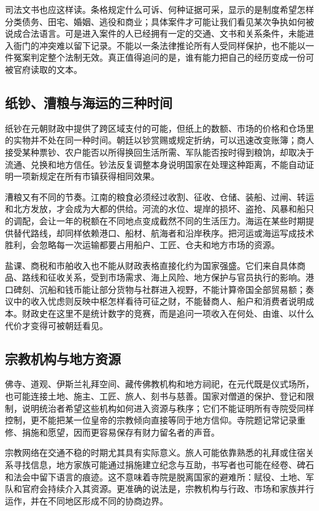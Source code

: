 司法文书也应这样读。条格规定什么可诉、何种证据可采，显示的是制度希望怎样分类债务、田宅、婚姻、逃役和商业；具体案件才可能让我们看见某次争执如何被说成合法语言。可是进入案件的人已经拥有一定的交通、文书和关系条件，未能进入衙门的冲突难以留下记录。不能以一条法律推论所有人受同样保护，也不能以一件冤案判定整个法制无效。真正值得追问的是，谁有能力把自己的经历变成一份可被官府读取的文本。

\subsection{纸钞、漕粮与海运的三种时间}

纸钞在元朝财政中提供了跨区域支付的可能，但纸上的数额、市场的价格和仓场里的实物并不处在同一种时间。朝廷以钞赏赐或规定折纳，可以迅速改变账簿；商人接受某种票钞、农户能否以所得换回生活所需、军队能否按时得到粮饷，却取决于流通、兑换和地方信任。钞法反复调整本身说明国家在处理这种距离，不能自动证明一项新规定在所有市镇获得相同效果。

漕粮又有不同的节奏。江南的粮食必须经过收割、征收、仓储、装船、过闸、转运和北方发放，才会成为大都的供给。河流的水位、堤岸的损坏、盗抢、风暴和船只的调配，会让一年的税额在不同地点变成截然不同的生活压力。海运在某些时期提供替代路线，却同样依赖港口、船材、航海者和沿岸秩序。把河运或海运写成技术胜利，会忽略每一次运输都要占用船户、工匠、仓夫和地方市场的资源。

盐课、商税和市舶收入也不能从财政表格直接化约为国家强盛。它们来自具体商品、路线和征收关系，受到市场需求、海上风险、地方保护与官员执行的影响。港口碑刻、沉船和钱币能让部分货物与社群进入视野，不能计算帝国全部贸易额；奏议中的收入忧虑则反映中枢怎样看待可征之财，不能替商人、船户和消费者说明成本。财政史在这里不是统计数字的竞赛，而是追问一项收入在何处、由谁、以什么代价才变得可被朝廷看见。

\subsection{宗教机构与地方资源}

佛寺、道观、伊斯兰礼拜空间、藏传佛教机构和地方祠祀，在元代既是仪式场所，也可能连接土地、施主、工匠、旅人、刻书与慈善。国家对僧道的保护、登记和限制，说明统治者希望这些机构如何进入资源与秩序；它们不能证明所有寺院受同样控制，更不能把某一位皇帝的宗教倾向直接等同于地方信仰。寺院题记常记录重修、捐施和愿望，因而更容易保存有财力留名者的声音。

宗教网络在交通不稳的时期尤其具有实际意义。旅人可能依靠熟悉的礼拜或住宿关系寻找信息，地方家族可能通过捐施建立纪念与互助，书写者也可能在经卷、碑石和法会中留下语言的痕迹。这不意味着寺院是脱离国家的避难所：赋役、土地、军队和官府会持续介入其资源。更准确的说法是，宗教机构与行政、市场和家族并行运作，并在不同地区形成不同的协商边界。

